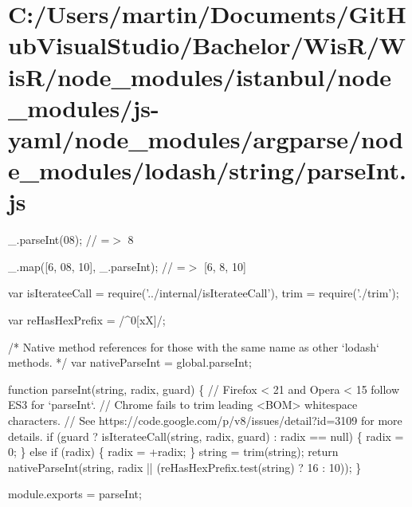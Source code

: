 \hypertarget{_c_1_2_users_2martin_2_documents_2_git_hub_visual_studio_2_bachelor_2_wis_r_2_wis_r_2node_module1276245f39290faf8b455f7526cc9149}{}\section{C\+:/\+Users/martin/\+Documents/\+Git\+Hub\+Visual\+Studio/\+Bachelor/\+Wis\+R/\+Wis\+R/node\+\_\+modules/istanbul/node\+\_\+modules/js-\/yaml/node\+\_\+modules/argparse/node\+\_\+modules/lodash/string/parse\+Int.\+js}
\+\_\+.\+parse\+Int(\textquotesingle{}08\textquotesingle{}); // =$>$ 8

\+\_\+.\+map(\mbox{[}\textquotesingle{}6\textquotesingle{}, \textquotesingle{}08\textquotesingle{}, \textquotesingle{}10\textquotesingle{}\mbox{]}, \+\_\+.\+parse\+Int); // =$>$ \mbox{[}6, 8, 10\mbox{]}


\begin{DoxyCodeInclude}
var isIterateeCall = require(\textcolor{stringliteral}{'../internal/isIterateeCall'}),
    trim = require(\textcolor{stringliteral}{'./trim'});

var reHasHexPrefix = /^0[xX]/;

\textcolor{comment}{/* Native method references for those with the same name as other `lodash` methods. */}
var nativeParseInt = global.parseInt;

\textcolor{keyword}{function} parseInt(\textcolor{keywordtype}{string}, radix, guard) \{
  \textcolor{comment}{// Firefox < 21 and Opera < 15 follow ES3 for `parseInt`.}
  \textcolor{comment}{// Chrome fails to trim leading <BOM> whitespace characters.}
  \textcolor{comment}{// See https://code.google.com/p/v8/issues/detail?id=3109 for more details.}
  \textcolor{keywordflow}{if} (guard ? isIterateeCall(\textcolor{keywordtype}{string}, radix, guard) : radix == null) \{
    radix = 0;
  \} \textcolor{keywordflow}{else} \textcolor{keywordflow}{if} (radix) \{
    radix = +radix;
  \}
  \textcolor{keywordtype}{string} = trim(\textcolor{keywordtype}{string});
  \textcolor{keywordflow}{return} nativeParseInt(\textcolor{keywordtype}{string}, radix || (reHasHexPrefix.test(\textcolor{keywordtype}{string}) ? 16 : 10));
\}

module.exports = parseInt;
\end{DoxyCodeInclude}
 